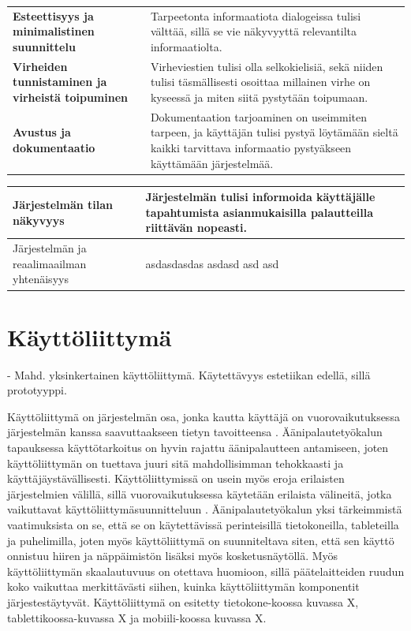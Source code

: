 \documentclass[utf8]{gradu3}
\begin{document}
\begin{table}[htbp]
\begin{tabular}{p{12.355em}p{21.855em}}
    \textbf{Esteettisyys ja minimalistinen suunnittelu} & Tarpeetonta informaatiota dialogeissa tulisi välttää, sillä se vie näkyvyyttä relevantilta informaatiolta. \\
    \textbf{Virheiden tunnistaminen ja virheistä toipuminen} & Virheviestien tulisi olla selkokielisiä, sekä niiden tulisi täsmällisesti osoittaa millainen virhe on kyseessä ja miten siitä pystytään toipumaan. \\
    \textbf{Avustus ja dokumentaatio} & Dokumentaation tarjoaminen on useimmiten tarpeen, ja käyttäjän tulisi pystyä löytämään sieltä kaikki tarvittava informaatio pystyäkseen käyttämään järjestelmää. \\
    \end{tabular}%
  \label{tab:addlabel}%
\end{table}%

\begin{center}
\begin{tabular}[t]{|p{5cm}|p{5cm}|}
    \hline
    Järjestelmän tilan näkyvyys  & Järjestelmän tulisi informoida käyttäjälle tapahtumista asianmukaisilla palautteilla riittävän nopeasti. \\
    \hline
	Järjestelmän ja reaalimaailman yhtenäisyys  & asdasdasdas asdasd asd asd \\
    \hline
\end{tabular}
\end{center}


\section{Käyttöliittymä}

- Mahd. yksinkertainen käyttöliittymä. Käytettävyys estetiikan edellä, sillä prototyyppi.

Käyttöliittymä on järjestelmän osa, jonka kautta käyttäjä on vuorovaikutuksessa järjestelmän kanssa saavuttaakseen tietyn tavoitteensa \parencite[][]{stone}. Äänipalautetyökalun tapauksessa käyttötarkoitus on hyvin rajattu äänipalautteen antamiseen, joten käyttöliittymän on tuettava juuri sitä mahdollisimman tehokkaasti ja käyttäjäystävällisesti.  Käyttöliittymissä on usein myös eroja erilaisten järjestelmien välillä, sillä vuorovaikutuksessa käytetään erilaista välineitä, jotka vaikuttavat käyttöliittymäsuunnitteluun \parencite[][]{stone}. Äänipalautetyökalun yksi tärkeimmistä vaatimuksista on se, että se on käytettävissä perinteisillä tietokoneilla, tableteilla ja puhelimilla, joten myös käyttöliittymä on suunniteltava siten, että sen käyttö onnistuu hiiren ja näppäimistön lisäksi myös kosketusnäytöllä. Myös käyttöliittymän skaalautuvuus on otettava huomioon, sillä päätelaitteiden ruudun koko vaikuttaa merkittävästi siihen, kuinka käyttöliittymän komponentit järjestestäytyvät. Käyttöliittymä on esitetty tietokone-koossa kuvassa X, tablettikoossa-kuvassa X ja mobiili-koossa kuvassa X.
\end{document}
